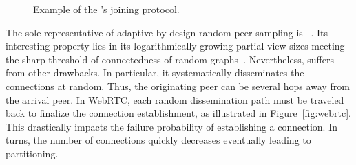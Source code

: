 \begin{figure*}
  \centering
  \hspace{8pt}
  \hspace{8pt}
  \caption{\label{fig:joiningexample}Example of the \SPRAY's joining
    protocol.}
\end{figure*}

The sole representative of adaptive-by-design random peer sampling is
\SCAMP~\cite{ganesh2001scamp,ganesh2003peer}. Its interesting property lies in
its logarithmically growing partial view sizes meeting the sharp threshold of
connectedness of random graphs~\cite{erdos1959random}. Nevertheless, \SCAMP
suffers from other drawbacks. In particular, it systematically disseminates the
connections at random. Thus, the originating peer can be several hops away from
the arrival peer. In WebRTC, each random dissemination path must be traveled
back to finalize the connection establishment, as illustrated in
Figure~\ref{fig:webrtc}. This drastically impacts the \SCAMP failure probability
of establishing a connection. In turns, the number of connections quickly
decreases eventually leading to partitioning.

